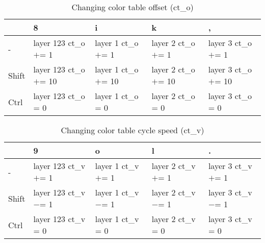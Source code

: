 \documentclass[10pt,a4paper]{article}
\begin{document}
\begin{table}[h!]
    \caption{Changing color table offset (ct\_o)}
    \setlength{\tabcolsep}{0.0pt}
    \begin{tabularx}{\linewidth}{LLLLL}
        \toprule
                   & 8                       & i                     & k                     & ,                     \\
        \midrule
        -          & layer 123 ct\_o $+$= 1  & layer 1 ct\_o $+$= 1  & layer 2 ct\_o $+$= 1  & layer 3 ct\_o $+$= 1  \\
        Shift      & layer 123 ct\_o $+$= 10 & layer 1 ct\_o $+$= 10 & layer 2 ct\_o $+$= 10 & layer 3 ct\_o $+$= 10 \\
        Ctrl       & layer 123 ct\_o = 0     & layer 1 ct\_o = 0     & layer 2 ct\_o = 0     & layer 3 ct\_o = 0     \\
        \bottomrule
    \end{tabularx}
\end{table}

\begin{table}[h!]
    \caption{Changing color table cycle speed (ct\_v)}
    \setlength{\tabcolsep}{0.0pt}
    \begin{tabularx}{\linewidth}{LLLLL}
        \toprule
                   & 9                      & o                    & l                    & .                    \\
        \midrule
        -          & layer 123 ct\_v $+$= 1 & layer 1 ct\_v $+$= 1 & layer 2 ct\_v $+$= 1 & layer 3 ct\_v $+$= 1 \\
        Shift      & layer 123 ct\_v $-$= 1 & layer 1 ct\_v $-$= 1 & layer 2 ct\_v $-$= 1 & layer 3 ct\_v $-$= 1 \\
        Ctrl       & layer 123 ct\_v = 0    & layer 1 ct\_v = 0    & layer 2 ct\_v = 0    & layer 3 ct\_v = 0    \\
        \bottomrule
    \end{tabularx}
\end{table}
\end{document}
